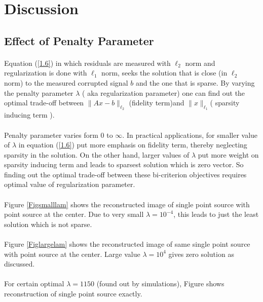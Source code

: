 \section{Discussion}
\label{s:discussion}

\subsection{Effect of Penalty Parameter}
\label{s:discussion_pp}

\paragraph{}Equation (\ref{1.6}) in which residuals are measured with $\ell_2$ norm and regularization is 
done with $\ell_1$ norm, seeks the solution that is close (in $\ell_2$ norm) to the 
measured corrupted signal $b$ and the one that is sparse. By varying the penalty parameter $\lambda$
( aka regularization parameter) one can find out the optimal trade-off between $\parallel Ax-b \parallel_{\ell_2}$
(fidelity term)and $\parallel x \parallel_{\ell_1}$( sparsity inducing term ).
\paragraph{}Penalty parameter varies form 0 to $\infty$. In practical applications, for smaller value of $\lambda$ in 
 equation (\ref{1.6}) put more emphasis on fidelity term, thereby neglecting sparsity in the solution. On the other
hand, larger values of $ \lambda$ put more weight on sparsity inducing term and leads to
sparsest solution which is zero vector. So finding out the optimal trade-off between these bi-criterion objectives requires
optimal value of regularization parameter.
\paragraph{}Figure \ref{Figsmalllam} shows the reconstructed image of single point source with point source 
at the center. Due to very small $\lambda=10^{-4}$, this leads to just the least solution which is not sparse.
\paragraph{}Figure \ref{Figlargelam} shows the reconstructed image of same single point source with point source 
at the center. Large value $\lambda=10^{4}$ gives zero solution as discussed.
\paragraph{}For certain optimal $\lambda = 1150$ (found out by simulations), Figure  shows reconstruction
of single point source exactly.

